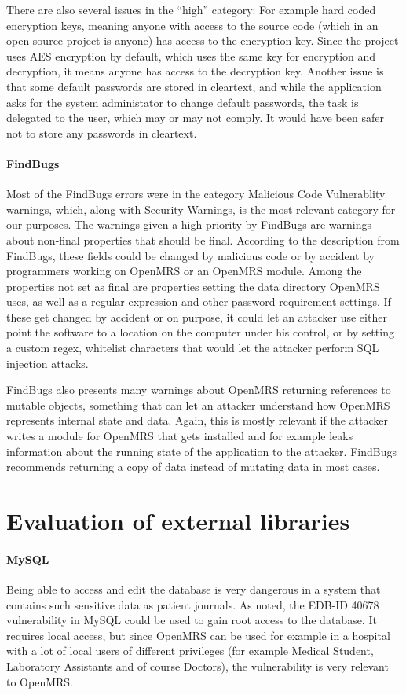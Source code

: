\documentclass{report} %
\begin{document}
There are also several issues in the ``high'' category: For example hard coded
encryption keys, meaning anyone with access to the source code (which in an open
source project is anyone) has access to the encryption key. Since the project
uses AES encryption by default, which uses the same key for encryption and
decryption, it means anyone has access to the decryption key. Another issue is
that some default passwords are stored in cleartext, and while the application
asks for the system administator to change default passwords, the task is
delegated to the user, which may or may not comply. It would have been safer not
to store any passwords in cleartext. 

\paragraph{FindBugs}
Most of the FindBugs errors were in the category Malicious Code Vulnerablity
warnings, which, along with Security Warnings, is the most relevant category
for our purposes. The warnings given a high priority by FindBugs are warnings
about non-final properties that should be final. According to the description
from FindBugs, these fields could be changed by malicious code or by accident by
programmers working on OpenMRS or an OpenMRS module. Among the properties not
set as final are properties setting the data directory OpenMRS uses, as well as
a regular expression and other password requirement settings. If these get
changed by accident or on purpose, it could let an attacker use either point the
software to a location on the computer under his control, or by setting a custom
regex, whitelist characters that would let the attacker perform SQL injection attacks.

FindBugs also presents many warnings about OpenMRS returning references to
mutable objects, something that can let an attacker understand how OpenMRS
represents internal state and data. Again, this is mostly relevant if the
attacker writes a module for OpenMRS that gets installed and for example leaks
information about the running state of the application to the attacker. FindBugs
recommends returning a copy of data instead of mutating data in most cases. 

\section{Evaluation of external libraries}
\paragraph{MySQL}
Being able to access and edit the database is very dangerous in a system that
contains such sensitive data as patient journals.
As noted, the EDB-ID 40678 vulnerability in MySQL could be used to gain root
access to the database. It requires local access, but since OpenMRS can be used
for example in a hospital with a lot of local users of different privileges (for
example Medical Student, Laboratory Assistants and of course Doctors), the
vulnerability is very relevant to OpenMRS. 
\end{document}

